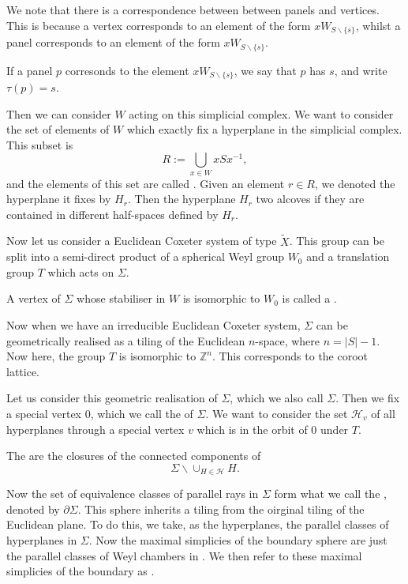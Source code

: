 \documentclass[11pt]{article}
\begin{document}
We note that there is a correspondence between between panels and vertices. This is because a vertex corresponds to an element of the form $xW_{S\backslash \{s\}}$, whilst a panel corresponds to an element of the form $xW_{S\backslash \{s\}}$. 

\begin{definition}
    If a panel $p$ corresonds to the element $xW_{S\backslash \{s\}}$, we say that $p$ has  $s$, and write $\tau(p)=s$. 
\end{definition}

Then we can consider $W$ acting on this simplicial complex.
We want to consider the set of elements of $W$ which exactly fix a hyperplane in the simplicial complex. This subset is
\[R:=\bigcup_{x\in W}xSx^{-1},\]
and the elements of this set are called . Given an element $r\in R$, we denoted the hyperplane it fixes by $H_r$. Then the hyperplane $H_r$  two alcoves if they are contained in different half-spaces defined by $H_r$. 

Now let us consider a Euclidean Coxeter system of type $\tilde{X}$. This group can be split into a semi-direct product of a spherical Weyl group $W_0$ and a translation group $T$ which acts on $\Sigma$.
\begin{definition}
    A vertex of $\Sigma$ whose stabiliser in $W$ is isomorphic to $W_0$ is called a .
\end{definition}

Now when we have an irreducible Euclidean Coxeter system, $\Sigma$ can be geometrically realised as a tiling of the Euclidean $n$-space, where $n=|S|-1$. Now here, the group $T$ is isomorphic to $\mathbb{Z}^n$. This corresponds to the coroot lattice. 

Let us consider this geometric realisation of $\Sigma$, which we also call $\Sigma$. Then we fix a special vertex 0, which we call the  of $\Sigma$. We want to consider the set $\mathcal{H}_v$ of all hyperplanes through a special vertex $v$ which is in the orbit of 0 under $T$. 

\begin{definition}
    The  are the closures of the connected components of \[\Sigma\backslash \cup_{H\in\mathcal{H}}H.\]
\end{definition}


Now the set of equivalence classes of parallel rays in $\Sigma$ form what we call the , denoted by $\partial\Sigma$. This sphere inherits a tiling from the oirginal tiling of the Euclidean plane. To do this, we take, as the hyperplanes, the parallel classes of hyperplanes in $\Sigma$. 
Now the maximal simplicies of the boundary sphere are just the parallel classes of Weyl chambers in \sg. We then refer to these maximal simplicies of the boundary as .
\end{document}
